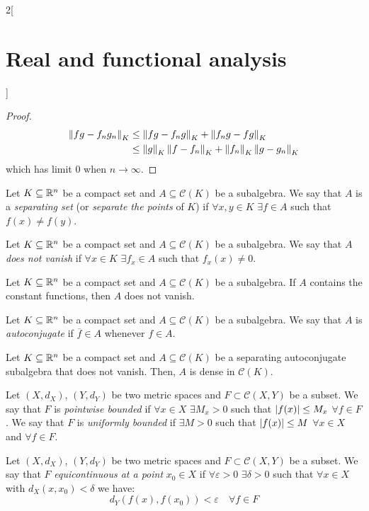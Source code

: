 \documentclass[../../../main_math.tex]{subfiles}
\begin{document}
\begin{multicols}{2}[\section{Real and functional analysis}]
\begin{proof}
\begin{align*}
      \left\|fg-f_ng_n\right\|_K & \leq \left\|fg-f_ng\right\|_K+\left\|f_ng-fg\right\|_K                  \\
                         & \leq\left\|g\right\|_K\left\|f-f_n\right\|_K+\left\|f_n\right\|_K\left\|g-g_n\right\|_K
    \end{align*}
    which has limit 0 when $n\to\infty$.
  \end{proof}
  \begin{definition}
    Let $K\subseteq \mathbb{R}^n$ be a compact set and $A\subseteq \mathcal{C}(K)$ be a subalgebra. We say that $A$ is a \emph{separating set} (or \emph{separate the points} of $K$) if $\forall x,y\in K$ $\exists f\in A$ such that $f(x)\ne f(y)$.
  \end{definition}
  \begin{definition}
    Let $K\subseteq \mathbb{R}^n$ be a compact set and $A\subseteq \mathcal{C}(K)$ be a subalgebra. We say that $A$ \emph{does not vanish} if $\forall x\in K$ $\exists f_x\in A$ such that $f_x(x)\ne 0$.
  \end{definition}
  \begin{lemma}
    Let $K\subseteq \mathbb{R}^n$ be a compact set and $A\subseteq \mathcal{C}(K)$ be a subalgebra. If $A$ contains the constant functions, then $A$ does not vanish.
  \end{lemma}
  \begin{definition}
    Let $K\subseteq \mathbb{R}^n$ be a compact set and $A\subseteq \mathcal{C}(K)$ be a subalgebra. We say that $A$ is \emph{autoconjugate} if $\overline{f}\in A$ whenever $f\in A$.
  \end{definition}
  \begin{theorem}
    Let $K\subseteq \mathbb{R}^n$ be a compact set and $A\subseteq \mathcal{C}(K)$ be a separating autoconjugate subalgebra that does not vanish. Then, $A$ is dense in $\mathcal{C}(K)$.
  \end{theorem}
  \begin{definition}
    Let $(X,d_X)$, $(Y,d_Y)$ be two metric spaces and $F\subset\mathcal{C}(X,Y)$ be a subset. We say that $F$ is \emph{pointwise bounded} if $\forall x\in X$ $\exists M_x>0$ such that $\abs{f(x)}\leq M_x$ $\forall f\in F$.
    We say that $F$ is \emph{uniformly bounded} if $\exists M>0$ such that $\abs{f(x)}\leq M$ $\forall x\in X$ and $\forall f\in F$.
  \end{definition}
  \begin{definition}
    Let $(X,d_X)$, $(Y,d_Y)$ be two metric spaces and $F\subset\mathcal{C}(X,Y)$ be a subset. We say that $F$ \emph{equicontinuous at a point} $x_0\in X$ if $\forall \varepsilon>0$ $\exists \delta>0$ such that $\forall x\in X$ with $d_X(x,x_0)<\delta$ we have: $$d_Y(f(x),f(x_0))<\varepsilon\quad\forall f\in F$$

\end{definition}
\end{multicols}
\end{document}
